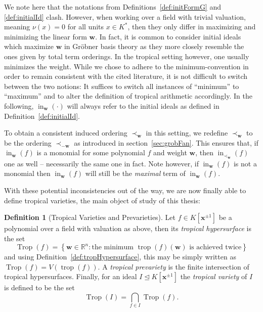 \documentclass[
  paper=a4,
  titlepage,
  bibliography=totoc,
  listof=totoc,
  pagesize=pdftex
]{scrartcl}
\numberwithin{figure}{section}
\numberwithin{equation}{section}
\numberwithin{table}{section}
\newcommand*\setR{\mathds{R}}
\let\vec\mathbf
\let\idealof\trianglelefteq
\DeclareMathOperator{\Trop}{Trop}
\DeclareMathOperator{\trop}{trop}
\DeclareMathOperator{\initial}{in}
\theoremstyle{definition}
\newtheorem{definition}{Definition}
\numberwithin{definition}{section}
\begin{document}
We note here that the notations from Definitions~\ref{def:initFormG} and
\ref{def:initialId} clash. However, when working over a field with trivial valuation,
meaning $\nu(x) = 0$ for all units $x \in K^*$, then they only differ in maximizing and
minimizing the linear form $\vec w$. In fact, it is common to consider initial ideals
which maximize $\vec w$ in Gröbner basis theory as they more closely resemble the ones
given by total term orderings. In the tropical setting however, one usually minimizes
the weight. While we chose to adhere to the minimum-convention in order to remain
consistent with the cited literature, it is not difficult to switch between the two
notions: It suffices to switch all instances of \enquote{minimum} to \enquote{maximum} and
to alter the definition of tropical arithmetic accordingly. In the following,
$\initial_{\vec w}(\cdot)$ will always refer to the initial ideals as defined in
Definition~\ref{def:initialId}.

To obtain a consistent induced ordering $\prec_{\vec w}$ in this setting, we redefine
$\prec_{\vec w}$ to be the ordering $\prec_{-\vec w}$ as introduced in
section~\ref{sec:grobFan}. This ensures that, if $\initial_{\vec w}(f)$ is a monomial for
some polynomial $f$ and weight $\vec w$, then $\initial_{\prec_{\vec w}}(f)$ one as well
-- necessarily the same one in fact. Note however, if $\initial_{\vec w}(f)$ is not a
monomial then $\initial_{\vec w}(f)$ will still be the \emph{maximal} term of
$\initial_{\vec w}(f)$.

With these potential inconsistencies out of the way, we are now finally able to define
tropical varieties, the main object of study of this thesis:

\begin{definition}[Tropical Varieties and Prevarieties]
  \label{def:tropicalVariety}
  Let $f \in K[\vec x^{\pm1}]$ be a polynomial over a field with valuation as above, then
  its \emph{tropical hypersurface} is the set
  \[
    \Trop(f) = \left\{
      \vec w \in \setR^n :
      \text{the minimum $\trop(f)(\vec w)$ is achieved twice}
    \right\}
  \]
  and using Definition~\ref{def:tropHypersurface}, this may be simply written as $\Trop(f)
  = V(\trop(f))$. A \emph{tropical prevariety} is the finite intersection of tropical
  hypersurfaces. Finally, for an ideal $I \idealof K[\vec x^{\pm1}]$ the \emph{tropical
  variety} of $I$ is defined to be the set
  \[
    \Trop(I) = \bigcap_{f \in I} \Trop(f).
  \]
\end{definition}
\end{document}

